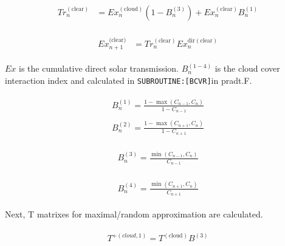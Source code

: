 \begin{eqnarray}
\begin{aligned}
T r_{n}^{(\text {clear})} &=E x_{n}^{(\text {cloud})}\left(1-B_{n}^{(3)}\right)+E x_{n}^{(\text {clear})} B_{n}^{(1)}
\end{aligned}
\end{eqnarray}

\begin{eqnarray}
\begin{aligned}
E x_{n+1}^{(\text {clear)} }&={Tr}_{n}^{(\text {clear})} E x_{n}^{\text {dir}(\text {clear})}
\end{aligned}
\end{eqnarray}

\(Ex\) is the cumulative direct solar transmission. \(B_{n}^{(1-4)}\) is
the cloud cover interaction index and calculated in
\texttt{SUBROUTINE:{[}BCVR{]}}in pradt.F.

\begin{eqnarray}
\begin{array}{l}
B_{n}^{(1)}=\frac{1-\max \left(C_{n-1}, C_{n}\right)}{1-C_{n-1}}
\end{array}
\end{eqnarray} \begin{eqnarray}
\begin{array}{l}
B_{n}^{(2)}=\frac{1-\max \left(C_{n+1}, C_{n}\right)}{1-C_{n+1}}
\end{array}
\end{eqnarray}

\begin{eqnarray}
\begin{array}{l}
B_{n}^{(3)}=\frac{\min \left(C_{n-1}, C_{n}\right)}{C_{n-1}}
\end{array}
\end{eqnarray}

\begin{eqnarray}
\begin{array}{l}
B_{n}^{(4)}=\frac{\min \left(C_{n+1}, C_{n}\right)}{C_{n+1}}
\end{array}
\end{eqnarray}

Next, T matrixes for maximal/random approximation are calculated.

\begin{eqnarray}
\begin{array}{l}
T^{+(cloud, 1)}=T^{(\text {cloud})} B^{(3)}
\end{array}
\end{eqnarray}

